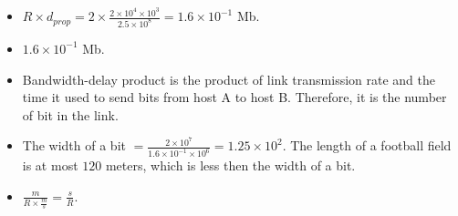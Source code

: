 \begin{pr}$ $
\begin{itemize}
\item $R\times d_{prop}=2\times\frac{2\times10^4\times10^3}{2.5\times10^8}=1.6\times10^{-1}$ Mb.
\item $1.6\times10^{-1}$ Mb.
\item Bandwidth-delay product is the product of link transmission rate and the time it used to send bits from host A to host B. Therefore, it is the number of bit in the link.
\item The width of a bit $=\frac{2\times10^7}{1.6\times10^{-1}\times10^6}=1.25\times10^2$. The length of a football field is at most $120$ meters, which is less then the width of a bit.
\item $\frac m{R\times\frac ms}=\frac sR$.
\end{itemize}
\end{pr}
